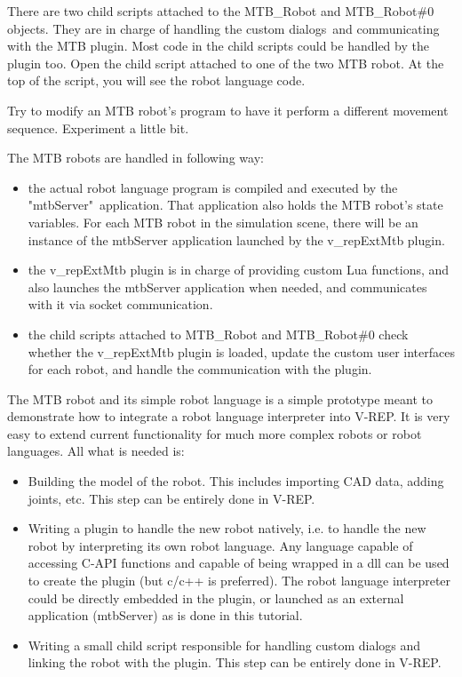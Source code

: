 There are two child scripts attached to the MTB\_Robot and MTB\_Robot\#0 
objects. They are in charge of handling the custom dialogs\ and communicating with the MTB plugin. Most code in the child 
scripts could be handled by the plugin too. Open the child script attached 
to one of the two MTB robot. At the top of the script,
you will see the robot language code.

Try to modify an MTB robot's program to have it perform a different 
movement sequence. Experiment a little bit.

The MTB robots are handled in following way:
\begin{itemize}[nosep]
	\item the actual robot language program is compiled and executed by 
		the "mtbServer"\ application. That application also holds the MTB 
		robot's state variables. For each MTB robot in the simulation scene, 
		there will be an instance of the mtbServer application launched by 
		the v\_repExtMtb plugin.
	\item the v\_repExtMtb plugin is in charge of providing custom Lua 
		functions, and also launches the mtbServer application when needed, 
		and communicates with it via socket communication.
	\item the child scripts attached to MTB\_Robot and MTB\_Robot\#0 check 
		whether the v\_repExtMtb plugin is loaded, update the custom user
		interfaces for each robot, and handle the communication with the plugin.
\end{itemize}

The MTB robot and its simple robot language is a simple prototype meant to 
demonstrate how to integrate a robot language interpreter into V-REP. It is 
very easy to extend current functionality for much more complex robots or
robot languages. All what is needed is:
\begin{itemize}[nosep]
	\item Building the model of the robot. This includes importing CAD data, 
		adding joints, etc. This step can be entirely done in V-REP.
	\item Writing a plugin to handle the new robot natively, i.e. to handle 
		the new robot by interpreting its own robot language. Any language 
		capable of accessing C-API functions and capable of being wrapped 
		in a dll can be used to create the plugin (but c/c++ is preferred). 
		The robot language interpreter could be directly embedded in the 
		plugin, or launched as an external application (mtbServer) as is 
		done in this tutorial.
	\item Writing a small child script responsible for handling custom 
		dialogs and linking the robot with the plugin. This step can be 
		entirely done in V-REP.
\end{itemize}

